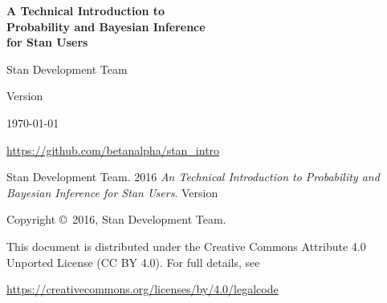 
\thispagestyle{empty}

{ \Huge
\noindent \textbf{A Technical Introduction to \\[3mm]
                           Probability and Bayesian Inference \\[2mm]
                           for Stan Users} 
}

\vspace{5mm}

{ \noindent \Large Stan Development Team }

\vfill

\begin{center}

{ \Large

Version \introversion

\today

\url{https://github.com/betanalpha/stan_intro}

}

\end{center}

\newpage
\thispagestyle{empty}

\mbox{}
\vfill


\noindent Stan Development Team. 2016  
{\it  An Technical Introduction to Probability and Bayesian Inference for Stan Users}. Version \introversion

\vspace{5mm}

\noindent Copyright \copyright \ 2016, Stan Development Team.

\vspace{5mm}

\noindent This document is distributed under the Creative Commons Attribute 4.0
Unported License (CC BY 4.0).  For full details, see

\begin{center}
\url{https://creativecommons.org/licenses/by/4.0/legalcode} 
\end{center}
